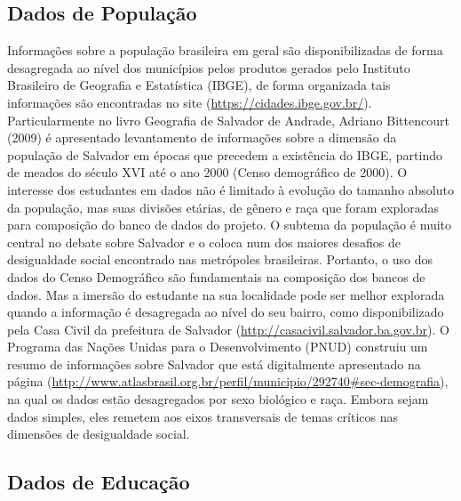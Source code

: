\documentclass[
]{book}
\begin{document}
\hypertarget{dados-de-populauxe7uxe3o}{%
\subsection{Dados de População}\label{dados-de-populauxe7uxe3o}}

Informações sobre a população brasileira em geral são disponibilizadas de forma desagregada ao nível dos municípios pelos produtos gerados pelo Instituto Brasileiro de Geografia e Estatística (IBGE), de forma organizada tais informações são encontradas no site (\url{https://cidades.ibge.gov.br/}). Particularmente no livro Geografia de Salvador de Andrade, Adriano Bittencourt (2009) é apresentado levantamento de informações sobre a dimensão da população de Salvador em épocas que precedem a existência do IBGE, partindo de meados do século XVI até o ano 2000 (Censo demográfico de 2000). O interesse dos estudantes em dados não é limitado à evolução do tamanho absoluto da população, mas suas divisões etárias, de gênero e raça que foram exploradas para composição do banco de dados do projeto. O subtema da população é muito central no debate sobre Salvador e o coloca num dos maiores desafios de desigualdade social encontrado nas metrópoles brasileiras. Portanto, o uso dos dados do Censo Demográfico são fundamentais na composição dos bancos de dados. Mas a imersão do estudante na sua localidade pode ser melhor explorada quando a informação é desagregada ao nível do seu bairro, como disponibilizado pela Casa Civil da prefeitura de Salvador (\url{http://casacivil.salvador.ba.gov.br}). O Programa das Nações Unidas para o Desenvolvimento (PNUD) construiu um resumo de informações sobre Salvador que está digitalmente apresentado na página (\url{http://www.atlasbrasil.org.br/perfil/municipio/292740\#sec-demografia}), na qual os dados estão desagregados por sexo biológico e raça. Embora sejam dados simples, eles remetem aos eixos transversais de temas críticos nas dimensões de desigualdade social.

\hypertarget{dados-de-educauxe7uxe3o}{%
\subsection{Dados de Educação}\label{dados-de-educauxe7uxe3o}}
\end{document}
